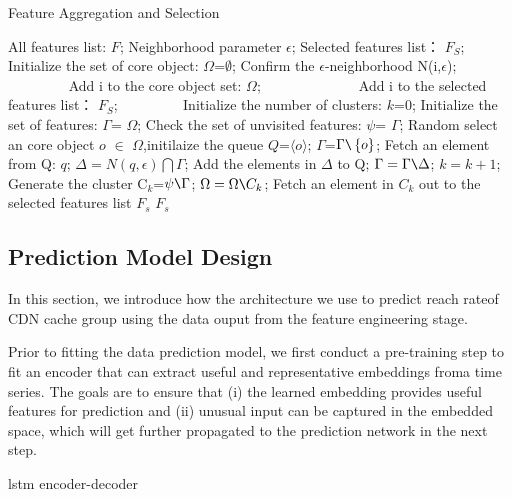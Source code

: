 \documentclass[5p]{elsarticle}
\newcommand{\dabiaolv}{reach rate}
\begin{document}
\begin{algorithm}[t]
\caption{Feature Aggregation and Selection} 
\begin{algorithmic}[1]
\Require  
    All features list: $F$;
    Neighborhood parameter $\epsilon$; 
\Ensure  
    Selected features list： $F_S$;  
\State Initialize the set of core object:  $\Omega$=$\emptyset$;
    \State Confirm the $\epsilon$-neighborhood\; N(i,$\epsilon$);
　　　　        \State Add i to the core object set: $\Omega$;
　　        \Else
　　　　        \State Add i to the selected features list： $F_S$;
　　　　    \EndIf
\EndFor
\State Initialize the number of clusters:  $k$=0;
\State Initialize the set of features:  $\Gamma$= $\Omega$;
\While{$\Omega\neq\emptyset$}
\State Check the set of unvisited features: $\psi$= $\Gamma$;
    \State Random select an core object $o$ $\in$ $\Omega$,initilaize the queue $Q$=$\langle o \rangle$;
\State $\Gamma$=$\Gamma \verb|\|\left\{o\right\}$;
    \State Fetch an element from Q: $q$;
    \State $\Delta=N(q,\epsilon)\bigcap\Gamma$;
    \State Add the elements in $\Delta$ to Q;
    \State  $\Gamma= \Gamma\verb|\|\Delta$;
\EndWhile
\State $k=k+1$;
\State Generate the cluster C$_k$=$\psi\verb|\|\Gamma$;
\State $\Omega=\Omega\verb|\|C_k$;
\EndWhile
{}
    \State Fetch an element in $C_k$ out to the selected features list $F_s$
\EndFor
\State \Return $F_s$
\end{algorithmic}
\end{algorithm}


\subsection{Prediction Model Design}

In this section, we introduce how the architecture we use to predict \dabiaolv of CDN cache group using the data ouput from the feature engineering stage. 

Prior to fitting the data prediction model, we first conduct a pre-training step to fit an encoder that can extract useful and representative embeddings froma  time  series.  The  goals  are  to  ensure  that  (i)  the  learned embedding  provides  useful  features  for  prediction  and  (ii) unusual input can be captured in the embedded space, which will get further propagated to the prediction network in the next step.

lstm encoder-decoder
\end{document}

